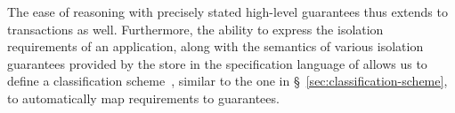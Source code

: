 The ease of reasoning with precisely stated high-level guarantees thus
extends to transactions as well. Furthermore, the ability to express
the isolation requirements of an application, along with the semantics
of various isolation guarantees provided by the store in the
specification language of \name allows us to define a classification
scheme~\cite{pldi15}, similar to the one in
\S~\ref{sec:classification-scheme}, to automatically map requirements
to guarantees. 
